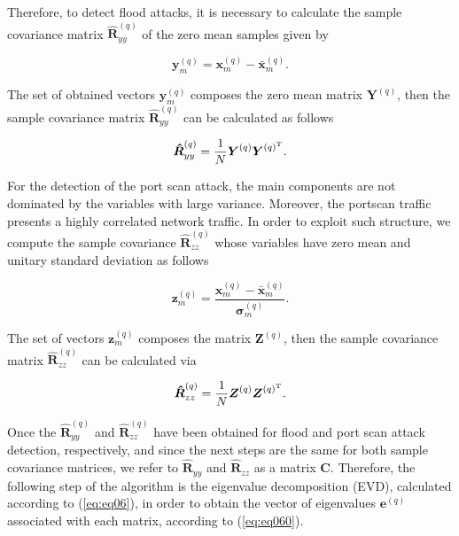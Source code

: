 Therefore, to detect flood attacks, it is necessary to calculate the sample covariance matrix $\boldsymbol{\hat{R}}_{yy}^{(q)}$ of the zero mean samples given by

\begin{equation}\label{eq:eq02}
\boldsymbol{y}_{m}^{(q)} = \boldsymbol{x}_{m}^{(q)} - \bar{\boldsymbol{x}}_{m}^{(q)}.
\end{equation}

The set of obtained vectors $\boldsymbol{y}_{m}^{(q)}$ composes the zero mean matrix $\boldsymbol{Y}^{(q)}$, then the sample covariance matrix $\boldsymbol{\hat{R}}_{yy}^{(q)}$ can be calculated as follows

\begin{equation}\label{eq:eq03}
\boldsymbol{\hat{R}}_{yy}^{(q)} = \frac{1}{N}\boldsymbol{Y}^{(q)}\boldsymbol{Y}^{(q)^{\rm T}}.
\end{equation}

For the detection of the port scan attack, the main components are not dominated by the variables with large variance. Moreover, the portscan traffic presents a highly correlated network traffic. In order to exploit such structure, we compute the sample covariance $\boldsymbol{\hat{R}}_{zz}^{(q)}$ whose variables have zero mean and unitary standard deviation as follows

\begin{equation}\label{eq:eq04}
\boldsymbol{z}_{m}^{(q)} = \frac{\boldsymbol{x}_{m}^{(q)} - \bar{\boldsymbol{x}}_{m}^{(q)}}{\boldsymbol{\sigma}_{m}^{(q)}}.
\end{equation}

The set of vectors $\boldsymbol{z}_{m}^{(q)}$ composes the matrix $\boldsymbol{Z}^{(q)}$, then the sample covariance matrix $\boldsymbol{\hat{R}}_{zz}^{(q)}$ can be calculated via 

\begin{equation}\label{eq:eq05}
\boldsymbol{\hat{R}}_{zz}^{(q)} = \frac{1}{N}\boldsymbol{Z}^{(q)}\boldsymbol{Z}^{(q)^{\rm T}}.
\end{equation}

Once the $\boldsymbol{\hat{R}}_{yy}^{(q)}$ and $\boldsymbol{\hat{R}}_{zz}^{(q)}$ have been obtained for flood and port scan attack detection, respectively, and since the next steps are the same for both sample covariance matrices, we refer to $\boldsymbol{\hat{R}}_{yy}$ and $\boldsymbol{\hat{R}}_{zz}$ as a matrix $\boldsymbol{C}$. Therefore, the following step of the algorithm is the eigenvalue decomposition (EVD), calculated according to (\ref{eq:eq06}), in order to obtain the vector of eigenvalues $\boldsymbol{e}^{(q)}$ associated with each matrix, according to (\ref{eq:eq060}).

